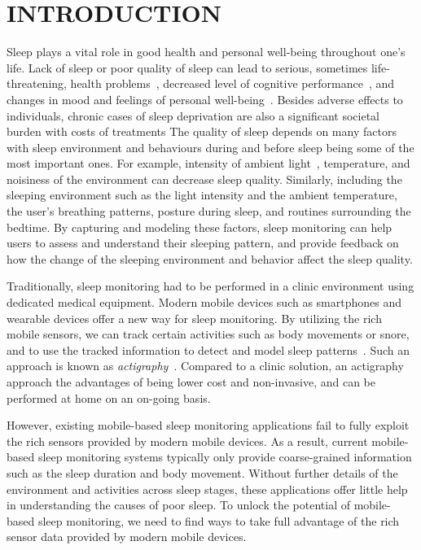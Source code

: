 \section{INTRODUCTION}\label{sec:1introduction}

Sleep plays a vital role in good health and personal well-being throughout one's life. Lack of sleep or poor quality of sleep can lead to
serious, sometimes life-threatening, health problems~\cite{altena2008sleep,chandola2010effect,lallukka2016contribution}, decreased level of 
cognitive performance~\cite{alhola07sleep,akerstedt07altered}, and changes in mood and feelings of personal well-being~\cite{paunio09longitudinal,pilcher97sleep}. 
Besides adverse effects to individuals, chronic cases of sleep deprivation are also a significant societal burden with costs of treatments 
The quality of sleep depends on many factors with sleep environment and behaviours during and before sleep being some of the most important ones.
For example, intensity of ambient light~\cite{hood04determinants}, temperature, and noisiness of the environment can decrease sleep quality. Similarly, including the sleeping environment such as the light intensity and the ambient temperature, the user's
breathing patterns, posture during sleep, and routines surrounding the bedtime. By capturing and modeling these factors, sleep monitoring can help users to assess
and understand their sleeping pattern, and provide feedback on how the change of the sleeping environment and behavior affect the sleep
quality.

Traditionally, sleep monitoring had to be performed in a clinic environment using dedicated medical equipment.  Modern mobile devices such
as smartphones and wearable devices offer a new way for sleep monitoring. By utilizing the rich mobile sensors, we can track certain
activities such as body movements or snore, and to use the tracked information to detect and model sleep
patterns~\cite{zeo,Jawbone,SleepAndroid,fitbit,gu2016sleep}. Such an approach is known as
\emph{actigraphy}~\cite{Actigraphy,ancoli2003role}. Compared to a clinic solution, an actigraphy approach the advantages of being lower
cost and non-invasive, and can be performed at home on an on-going basis.


However, existing mobile-based sleep monitoring applications fail to fully exploit the rich sensors provided by modern mobile devices. As a
result, current mobile-based sleep monitoring systems typically only provide coarse-grained information such as the sleep duration and body
movement. Without further details of the environment and activities across sleep stages, these applications offer little help in
understanding the causes of poor sleep. To unlock the potential of mobile-based sleep monitoring, we need to find ways to take full
advantage of the rich sensor data provided by modern mobile devices.


